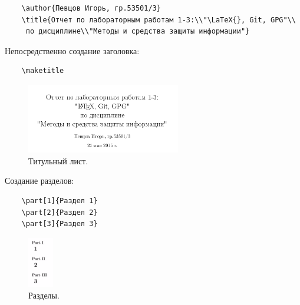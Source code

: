 \documentclass[a4paper, 14pt]{article}				%
\begin{document}
\begin{verbatim}
	\author{Певцов Игорь, гр.53501/3}
	\title{Отчет по лабораторным работам 1-3:\\"\LaTeX{}, Git, GPG"\\
	 по дисциплине\\"Методы и средства защиты информации"}
\end{verbatim}

Непосредственно создание заголовка:
\begin{verbatim}
	\maketitle
\end{verbatim}

\begin{figure}[h!]
\centering
\includegraphics[width=0.6\textwidth]{fig5}
\caption{Титульный лист.}
\end{figure}

Создание разделов:
\begin{verbatim}
	\part[1]{Раздел 1}
	\part[2]{Раздел 2}
	\part[3]{Раздел 3}
\end{verbatim}

\begin{figure}[h!]
\centering
\includegraphics[width=0.1\textwidth]{fig6}
\caption{Разделы.}
\end{figure}
\end{document}
